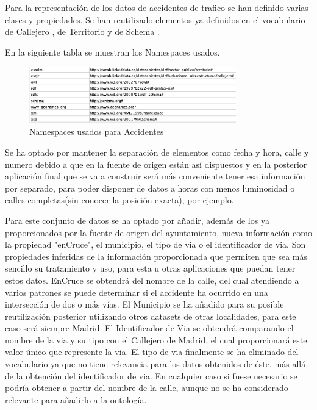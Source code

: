 Para la representación de los datos de accidentes de trafico se han definido varias clases y propiedades. Se han reutilizado elementos ya definidos en el vocabulario de Callejero \cite{ciudadesbiertas_callejero}, de Territorio \cite{datoabiertos_municipio} y de Schema \cite{schema_org}.

\clearpage
En la siguiente tabla se muestran los Namespaces usados.

\begin{figure}[h]
	\centering
		\includegraphics[angle=0, width=0.8\textwidth]{images/tablaIRIsAccidentesBici.png}  
	\caption{Namespaces usados para Accidentes}
\end{figure}




Se ha optado por mantener la separación de elementos como fecha y hora, calle y numero debido a que en la fuente de origen están así dispuestos y en la posterior aplicación final que se va a construir será más conveniente tener esa información por separado, para poder disponer de datos a horas con menos luminosidad o calles completas(sin conocer la posición exacta), por ejemplo.


Para este conjunto de datos se ha optado por añadir, además de los ya proporcionados por la fuente de origen del ayuntamiento, nueva información como la propiedad "enCruce", el municipio, el tipo de via o el identificador de via. Son propiedades inferidas de la información proporcionada que permiten que sea más sencillo su tratamiento y uso, para esta u otras aplicaciones que puedan tener estos datos.
EnCruce se obtendrá del nombre de la calle, del cual atendiendo a varios patrones se puede determinar si el accidente ha ocurrido en una intersección de dos o más vías.
El Municipio se ha añadido para su posible reutilización posterior utilizando otros datasets de otras localidades, para este caso será siempre Madrid.
El Identificador de Via se obtendrá comparando el nombre de la via y su tipo con el Callejero de Madrid, el cual proporcionará este valor único que represente la via.
El tipo de via finalmente se ha eliminado del vocabulario ya que no tiene relevancia para los datos obtenidos de éste, más allá de la obtención del identificador de via. En cualquier caso si fuese necesario se podría obtener a partir del nombre de la calle, aunque no se ha considerado relevante para añadirlo a la ontología.

